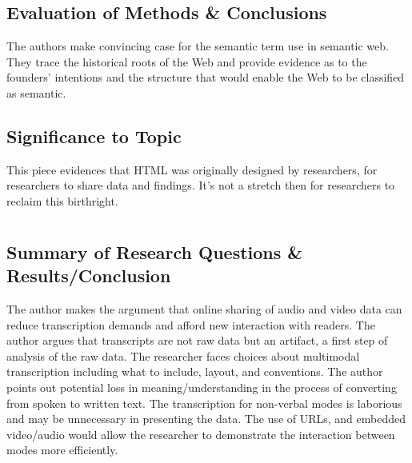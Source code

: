 \documentclass[leavefloats]{apa6e}\usepackage[]{graphicx}\usepackage[]{color}
\begin{document}
\subsection{Evaluation of Methods \& Conclusions} %
The authors make convincing case for the semantic term use in semantic web.  They trace the historical roots of the Web and provide evidence as to the founders' intentions and the structure that would enable the Web to be classified as semantic.

\subsection{Significance to Topic} %
This piece evidences that HTML was originally designed by researchers, for researchers to share data and findings.  It's not a stretch then for researchers to reclaim this birthright. 


 \section{\textcite{Knapton2013}}





\regpar



\subsection{Summary of Research Questions \& Results/Conclusion} %
The author makes the argument that online sharing of audio and video data can reduce transcription demands and afford new interaction with readers.  The author argues that transcripts are not raw data but an artifact, a first step of analysis of the raw data.  The researcher faces choices about multimodal transcription including what to include, layout, and conventions.  The author points out potential loss in meaning/understanding in the process of converting from spoken to written text.  The transcription for non-verbal modes is laborious and may be unnecessary in presenting the data.  The use of URLs, and embedded video/audio would allow the researcher to demonstrate the interaction between modes more efficiently.  
\end{document}
